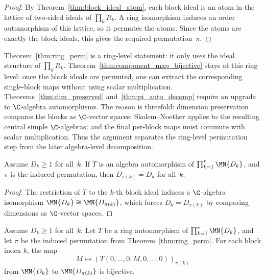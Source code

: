 \begin{proof}
    \leanok
    By Theorem~\ref{thm:block_ideal_atom}, each block ideal is an atom in the
    lattice of two-sided ideals of $\prod_k R_k$.
    A ring isomorphism induces an order automorphism of this lattice,
    so it permutes the atoms. Since the atoms are exactly the block ideals,
    this gives the required permutation~$\pi$.
\end{proof}

\begin{remark}\label{rem:ring_vs_alg}
    Theorem~\ref{thm:ring_perm} is a ring-level statement: it only uses the
    ideal structure of $\prod_k R_k$.
    Theorem~\ref{thm:component_map_bijective} stays at this ring level: once the
    block ideals are permuted, one can extract the corresponding single-block
    maps without using scalar multiplication.
    Theorems~\ref{thm:dim_preserved}
    and~\ref{thm:pi_auto_decomp} require an upgrade to $\C$-algebra
    automorphisms. The reason is threefold: dimension preservation compares
    the blocks as $\C$-vector spaces; Skolem--Noether applies to the resulting
    central simple $\C$-algebras; and the final per-block maps must commute
    with scalar multiplication. Thus the argument separates the ring-level
    permutation step from the later algebra-level decomposition.
\end{remark}

\begin{theorem}\label{thm:dim_preserved}
    \leanok
    Assume $D_k \ge 1$ for all~$k$.
    If $T$ is an algebra automorphism of
    $\prod_{k=1}^r \MN{D_k}$,
    and $\pi$ is the induced permutation, then
    $D_{\pi(k)} = D_k$ for all~$k$.
\end{theorem}

\begin{proof}\leanok{}
    The restriction of $T$ to the $k$-th block ideal
    induces a $\C$-algebra isomorphism
    $\MN{D_k} \cong \MN{D_{\pi(k)}}$,
    which forces $D_k = D_{\pi(k)}$
    by comparing dimensions as $\C$-vector spaces.
\end{proof}

\begin{theorem}\label{thm:component_map_bijective}
    \leanok
    Assume $D_k \ge 1$ for all~$k$.
    Let $T$ be a ring automorphism of $\prod_{k=1}^r \MN{D_k}$, and let $\pi$
    be the induced permutation from Theorem~\ref{thm:ring_perm}.
    For each block index $k$, the map
    \[
        M \mapsto (T(0, \ldots, 0, M, 0, \ldots, 0))_{\pi(k)}
    \]
    from $\MN{D_k}$ to $\MN{D_{\pi(k)}}$ is bijective.
\end{theorem}

